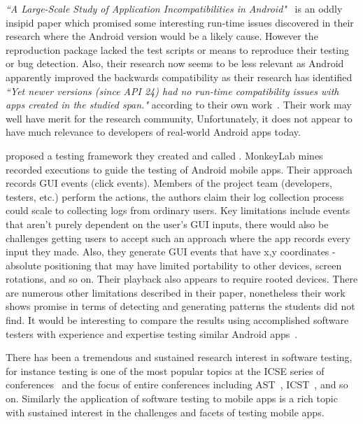 \emph{``A Large-Scale Study of Application Incompatibilities in Android"}~\cite{cai2019_large_scale_study_of_android_incompatibilities} is an oddly insipid paper which promised some interesting run-time issues discovered in their research where the Android version would be a likely cause. However the reproduction package lacked the test scripts or means to reproduce their testing or bug detection. Also, their research now seems to be less relevant as Android apparently improved the backwards compatibility as their research has identified \emph{``Yet newer versions (since API 24) had no run-time compatibility issues with apps created in the studied span."} according to their own work~. Their work may well have merit for the research community, Unfortunately, it does not appear to have much relevance to developers of real-world Android apps today.

\citeauthor{linares2015_mining_android_app_execution_traces_etc} proposed a testing framework they created and called . MonkeyLab mines recorded executions to guide the testing of Android mobile apps. Their approach records GUI events (click events). Members of the project team (developers, testers, etc.) perform the actions, the authors claim their log collection process could scale to collecting logs from ordinary users. Key limitations include events that aren't purely dependent on the user's GUI inputs, there would also be challenges getting users to accept such an approach where the app records every input they made. Also, they generate GUI events that have x,y coordinates - absolute positioning that may have limited portability to other devices, screen rotations, and so on. Their playback also appears to require rooted devices. There are numerous other limitations described in their paper, nonetheless their work shows promise in terms of detecting and generating patterns the students did not find. It would be interesting to compare the results using accomplished software testers with experience and expertise testing similar Android apps~.

There has been a tremendous and sustained research interest in software testing, for instance testing is one of the most popular topics at the ICSE series of conferences~ and the focus of entire conferences including AST~, ICST~, and so on. Similarly the application of software testing to mobile apps is a rich topic with sustained interest in the challenges and facets of testing mobile apps.

